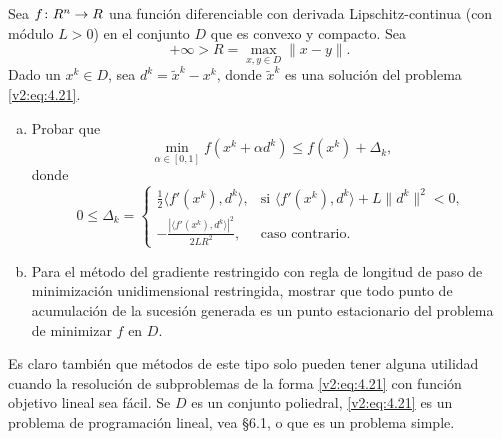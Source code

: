 \begin{exercise}\label{v2:ejer:4.1.10}
    Sea $f \colon R^n \to R$ una función diferenciable con derivada Lipschitz-continua (con módulo $L > 0$) en el conjunto $D$ que es convexo y compacto. Sea
    \[
        +\infty > R = \max_{x, y \in D} \|x - y\|.
    \]
    Dado un $x^k \in D$, sea $d^k = \tilde{x}^k - x^k$, donde $\tilde{x}^k$ es una solución del problema \eqref{v2:eq:4.21}.
    \begin{enumerate}[(a)]
        \item Probar que
        \[
            \min_{\alpha \in [0, 1]} f(x^k + \alpha d^k) \le f(x^k) + \Delta_k,
        \]
        donde
        \[
            0 \le \Delta_k = \begin{cases}
                \frac{1}{2} \langle f'(x^k), d^k \rangle, & \text{si } \langle f'(x^k), d^k \rangle + L\|d^k\|^2 < 0, \\
                -\frac{|\langle f'(x^k), d^k \rangle|^2}{2LR^2}, & \text{caso contrario}.
            \end{cases}
        \]
        \item Para el método del gradiente restringido con regla de longitud de paso de minimización unidimensional restringida, mostrar que todo punto de acumulación de la sucesión generada es un punto estacionario del problema de minimizar $f$ en $D$.
    \end{enumerate}
    Es claro también que métodos de este tipo solo pueden tener alguna utilidad cuando la resolución de subproblemas de la forma \eqref{v2:eq:4.21} con función objetivo lineal sea fácil. Se $D$ es un conjunto poliedral, \eqref{v2:eq:4.21} es un problema de programación lineal, vea \S 6.1, o que es un problema simple.
\end{exercise}

